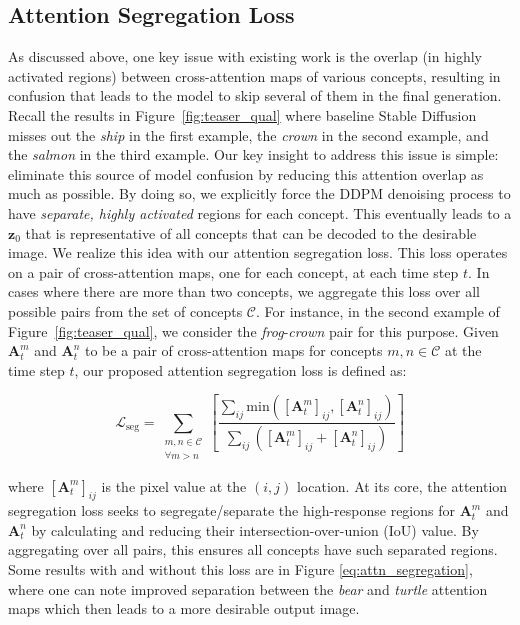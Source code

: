 \documentclass[10pt,twocolumn,letterpaper]{article}
\begin{document}
\subsection{Attention Segregation Loss}

As discussed above, one key issue with existing work \cite{rombach2022high} is the overlap (in highly activated regions) between cross-attention maps of various concepts, resulting in confusion that leads to the model to skip several of them in the final generation. Recall the results in Figure~\ref{fig:teaser_qual} where baseline Stable Diffusion \cite{rombach2022high} misses out the \textit{ship} in the first example, the \textit{crown} in the second example, and the \textit{salmon} in the third example. Our key insight to address this issue is simple: eliminate this source of model confusion by reducing this attention overlap as much as possible. By doing so, we explicitly force the DDPM denoising process to have \textit{separate, highly activated} regions for each concept. This eventually leads to a  $\mathbf{z}_{0}$ that is representative of all concepts that can be decoded to the desirable image. We realize this idea with our attention segregation loss. This loss operates on a pair of cross-attention maps, one for each concept, at each time step $t$. In cases where there are more than two concepts, we aggregate this loss over all possible pairs from the set of concepts $\mathcal{C}$. For instance, in the second example of Figure~\ref{fig:teaser_qual}, we consider the \textit{frog}-\textit{crown} pair for this purpose. Given $\mathbf{A}_t^m$ and $\mathbf{A}_t^n$ to be a pair of cross-attention maps for concepts $m, n \in \mathcal{C}$ at the time step $t$, our proposed attention segregation loss is defined as: 

\begin{equation}
    \mathcal{L}_\text{seg} = \sum_{\substack{m, n \in \mathcal{C} \\ \forall m>n }} \left[ \dfrac{\sum_{ij}\text{min}([\mathbf{A}_t^m]_{ij}, [\mathbf{A}_t^n]_{ij})}{\sum_{ij}([\mathbf{A}_t^m]_{ij} + [\mathbf{A}_t^n]_{ij})} \right]
    \label{eq:attn_segregation}
\end{equation}

where $[\mathbf{A}_t^m]_{ij}$ is the pixel value at the $(i,j)$ location. At its core, the attention segregation loss seeks to segregate/separate the high-response regions for $\mathbf{A}_t^m$ and $\mathbf{A}_t^n$ by calculating and reducing their intersection-over-union (IoU) value. By aggregating over all pairs, this ensures all concepts have such separated regions. Some results with and without this loss are in Figure \ref{eq:attn_segregation}, where one can note improved separation between the \textit{bear} and \textit{turtle} attention maps which then leads to a more desirable output image.
\end{document}
